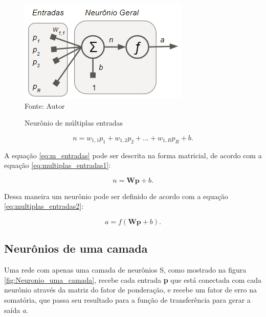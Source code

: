 \documentclass[
	12pt,				%
    oneside,			%
	a4paper,			%
	english,			%
	french,				%
	spanish,			%
	brazil,				%
	]{abntex2}
\begin{document}
\begin{figure}[H]
    \centering
    \caption{Neurônio de múltiplas entradas}
    \includegraphics[scale=1]{Neuronio_multipla_entrada1}\\
    Fonte: Autor \hfill
    \label{fig:Neuronio_multipla_entrada}
\end{figure}

  \begin{equation}
    \textit{n} = \textit{\[w_{1,1}p_1 + w_{1,2}p_2 +...+ w_{1,R}p_R + b. \]}
    \label{eq:m_entradas}
  \end{equation}
  
  A equação \ref{eq:m_entradas} pode ser descrita na forma matricial, de acordo com a equação \ref{eq:multiplas_entradas1}:
  
 \begin{equation}
    \textit{n} = \textbf{Wp} + \textit{b}.
    \label{eq:multiplas_entradas1}
  \end{equation}
  
  Dessa maneira um neurônio pode ser definido de acordo com a equação \ref{eq:multiplas_entradas2}:
  
 \begin{equation}
    \textit{a} = \textit{f}(\textbf{Wp} + \textit{b}).
    \label{eq:multiplas_entradas2}
  \end{equation} 
  
\subsection {Neurônios de uma camada} 

Uma rede com apenas uma camada de neurônios S, como mostrado na figura \ref{fig:Neuronio_uma_camada}, recebe cada entrada \textbf{p} que está conectada com cada neurônio através da matriz do fator de ponderação, e recebe um fator de erro na somatória, que passa seu resultado para a função de transferência para gerar a saída \textit{a}.
\end{document}
